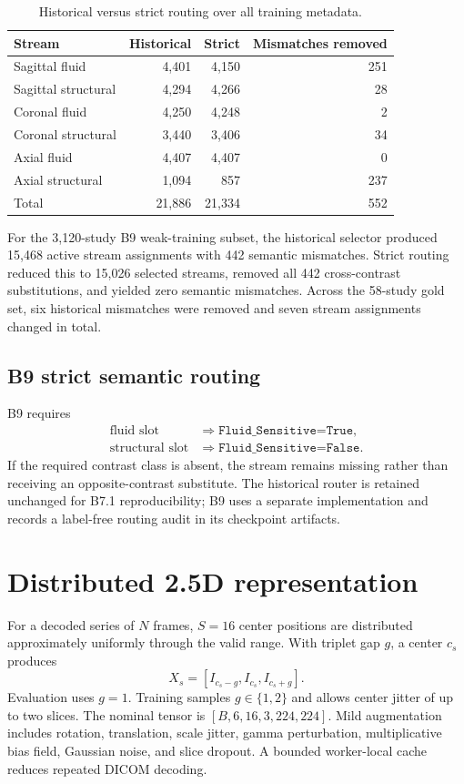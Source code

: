 \documentclass[preprint,12pt]{elsarticle}
\newcommand{\code}[1]{\texttt{#1}}
\begin{document}
\begin{table}[ht]
\centering
\caption{Historical versus strict routing over all training metadata.}
\label{tab:routing}
\begin{tabular}{lrrr}
\toprule
Stream & Historical & Strict & Mismatches removed \\
\midrule
Sagittal fluid & 4,401 & 4,150 & 251 \\
Sagittal structural & 4,294 & 4,266 & 28 \\
Coronal fluid & 4,250 & 4,248 & 2 \\
Coronal structural & 3,440 & 3,406 & 34 \\
Axial fluid & 4,407 & 4,407 & 0 \\
Axial structural & 1,094 & 857 & 237 \\
\midrule
Total & 21,886 & 21,334 & 552 \\
\bottomrule
\end{tabular}
\end{table}

For the 3,120-study B9 weak-training subset, the historical selector produced 15,468 active stream assignments with 442 semantic mismatches. Strict routing reduced this to 15,026 selected streams, removed all 442 cross-contrast substitutions, and yielded zero semantic mismatches. Across the 58-study gold set, six historical mismatches were removed and seven stream assignments changed in total.

\subsection{B9 strict semantic routing}
B9 requires
\begin{align}
\text{fluid slot} &\Rightarrow \code{Fluid\_Sensitive=True},\\
\text{structural slot} &\Rightarrow \code{Fluid\_Sensitive=False}.
\end{align}
If the required contrast class is absent, the stream remains missing rather than receiving an opposite-contrast substitute. The historical router is retained unchanged for B7.1 reproducibility; B9 uses a separate implementation and records a label-free routing audit in its checkpoint artifacts.

\section{Distributed 2.5D representation}
\label{sec:25d}

For a decoded series of $N$ frames, $S=16$ center positions are distributed approximately uniformly through the valid range. With triplet gap $g$, a center $c_s$ produces
\begin{equation}
X_s=[I_{c_s-g},I_{c_s},I_{c_s+g}].
\end{equation}
Evaluation uses $g=1$. Training samples $g\in\{1,2\}$ and allows center jitter of up to two slices. The nominal tensor is $[B,6,16,3,224,224]$. Mild augmentation includes rotation, translation, scale jitter, gamma perturbation, multiplicative bias field, Gaussian noise, and slice dropout. A bounded worker-local cache reduces repeated DICOM decoding.
\end{document}
